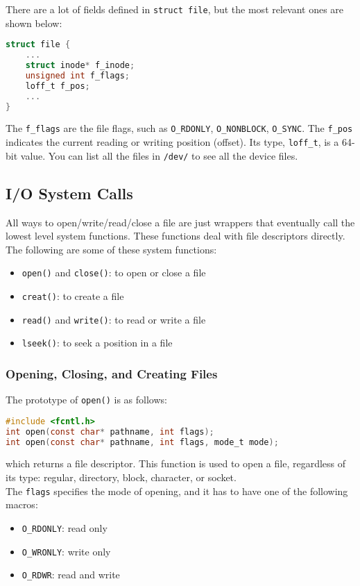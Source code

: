 \documentclass{article}
\renewcommand{\b}{\item[$\circ$]}
\newcommand{\newlist}{\begin{itemize}}
\renewcommand{\endlist}{\end{itemize}}
\newcommand{\code}[1]{\texttt{#1}}
\begin{document}
There are a lot of fields defined in \code{struct file}, but the most relevant ones are shown below: 

\begin{lstlisting}[language=C]
struct file {
    ...
    struct inode* f_inode;
    unsigned int f_flags;
    loff_t f_pos;
    ...
}
\end{lstlisting}

The \code{f\_flags} are the file flags, such as \code{O\_RDONLY}, \code{O\_NONBLOCK}, \code{O\_SYNC}. The \code{f\_pos} indicates the current reading or writing position (offset). Its type, \code{loff\_t}, is a 64-bit value. You can list all the files in \code{/dev/} to see all the device files. 

\subsection{I/O System Calls}

All ways to open/write/read/close a file are just wrappers that eventually call the lowest level system functions. These functions deal with file descriptors directly. The following are some of these system functions:

\newlist
\b \code{open()} and \code{close()}: to open or close a file
\b \code{creat()}: to create a file 
\b \code{read()} and \code{write()}: to read or write a file
\b \code{lseek()}: to seek a position in a file
\endlist

\subsubsection{Opening, Closing, and Creating Files}

The prototype of \code{open()} is as follows:

\begin{lstlisting}[language=C]
#include <fcntl.h>
int open(const char* pathname, int flags);
int open(const char* pathname, int flags, mode_t mode);
\end{lstlisting}

which returns a file descriptor. This function is used to open a file, regardless of its type: regular, directory, block, character, or socket. \\

The \code{flags} specifies the mode of opening, and it has to have one of the following macros:

\newlist
\b \code{O\_RDONLY}: read only
\b \code{O\_WRONLY}: write only
\b \code{O\_RDWR}: read and write
\endlist
\end{document}
